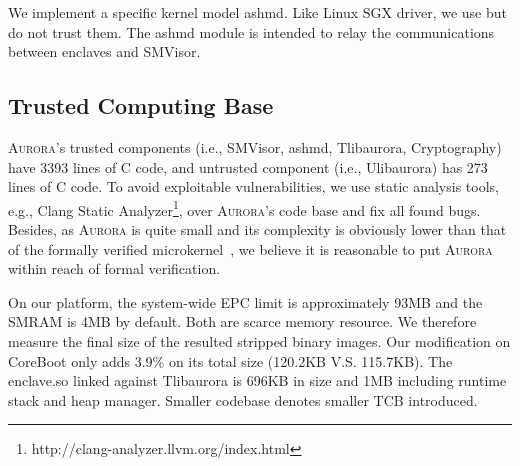 \documentclass[journal,twocolumn,letterpaper,10pt]{IEEEtran}
\begin{document}
We implement a specific kernel model ashmd. Like Linux SGX driver, we use but do not trust them. The ashmd module is intended to relay the communications between enclaves and SMVisor.

\subsection{Trusted Computing Base}\label{codebase}
\textsc{Aurora}'s trusted components (i.e., SMVisor, ashmd, Tlibaurora, Cryptography) have 3393 lines of C code, and untrusted component (i.e., Ulibaurora) has 273 lines of C code. %
To avoid exploitable vulnerabilities, we use static analysis tools, e.g., Clang Static Analyzer\footnote{http://clang-analyzer.llvm.org/index.html}, over \textsc{Aurora}'s code base and fix all found bugs. Besides, as \textsc{Aurora} is quite small and its complexity is obviously lower than that of the formally verified microkernel~\cite{DBLP:conf/sosp/KleinEHACDEEKNSTW09}, we believe it is reasonable to put \textsc{Aurora} within reach of formal verification.

On our platform, the system-wide EPC limit is approximately 93MB and the SMRAM is 4MB by default. Both are scarce memory resource. We therefore measure the final size of the resulted stripped binary images. Our modification on CoreBoot only adds 3.9\% on its total size (120.2KB V.S. 115.7KB). The enclave.so  linked against Tlibaurora is 696KB in size and 1MB including runtime stack and heap manager. Smaller codebase denotes smaller TCB introduced. 

%
\end{document}

